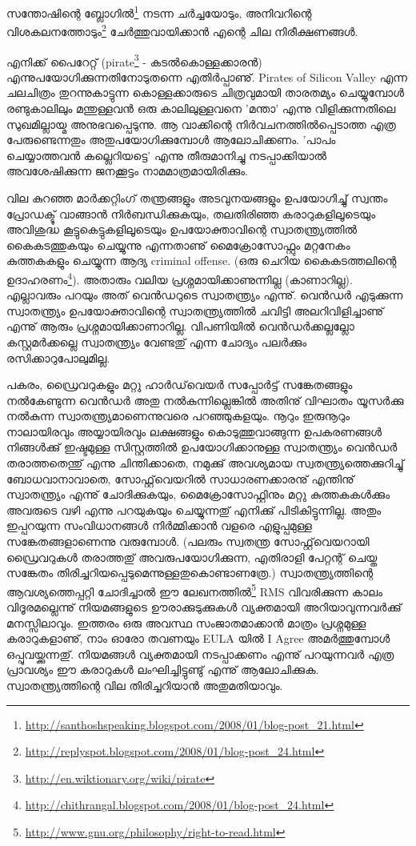﻿
\vskip 2pt

സന്തോഷിന്റെ ബ്ലോഗില്‍\footnote{\url{http://santhoshspeaking.blogspot.com/2008/01/blog-post_21.html}} നടന്ന ചര്‍ച്ചയോടും, 
അനിവറിന്റെ വിശകലനത്തോടും\footnote{\url{http://replyspot.blogspot.com/2008/01/blog-post_24.html}} ചേര്‍ത്തുവായിക്കാന്‍ 
എന്റെ ചില നിരീക്ഷണങ്ങള്‍.

എനിക്ക് പൈറേറ്റ് (pirate\footnote{\url{http://en.wiktionary.org/wiki/pirate}} - കടല്‍കൊള്ളക്കാരന്‍) 
എന്നുപയോഗിക്കുന്നതിനോടുതന്നെ എതിര്‍പ്പാണു്. Pirates of Silicon Valley എന്ന ചലചിത്രം തുറന്നുകാട്ടുന്ന 
കൊള്ളക്കാരുടെ ചിത്രവുമായി താരതമ്യം ചെയ്യുമ്പോള്‍ രണ്ടുകാലിലും മന്തുള്ളവന്‍ ഒരു കാലിലുള്ളവനെ 'മന്താ' 
എന്നു വിളിക്കുന്നതിലെ സുഖമില്ലായ്മ അനുഭവപ്പെടുന്നു. ആ വാക്കിന്റെ നിര്‍വചനത്തില്‍‌പ്പെടാത്ത എത്ര പേരുണ്ടെന്നതും 
അതുപയോഗിക്കുമ്പോള്‍ ആലോചിക്കണം. 'പാപം ചെയ്യാത്തവന്‍ കല്ലെറിയട്ടെ' എന്നു തീരുമാനിച്ചു നടപ്പാക്കിയാല്‍ 
അവശേഷിക്കുന്ന ജനക്കൂട്ടം നാമമാത്രമായിരിക്കും.

വില കുറഞ്ഞ മാര്‍ക്കറ്റിംഗ് തന്ത്രങ്ങളും അടവുനയങ്ങളും ഉപയോഗിച്ചു് സ്വന്തം പ്രോഡക്ടു് വാങ്ങാന്‍ നിര്‍ബന്ധിക്കുകയും,
തലതിരിഞ്ഞ കരാറുകളിലൂടെയും അവിശുദ്ധ കൂട്ടുകെട്ടുകളിലൂടെയും ഉപയോക്താവിന്റെ സ്വാതന്ത്ര്യത്തില്‍ കൈകടത്തുകയും 
ചെയ്യുന്നു എന്നതാണു് മൈക്രോസോഫ്റ്റും മറ്റനേകം കുത്തകകളും ചെയ്യുന്ന ആദ്യ criminal offense. 
(ഒരു ചെറിയ കൈകടത്തലിന്റെ ഉദാഹരണം\footnote{\url{http://chithrangal.blogspot.com/2008/01/blog-post_24.html}}). 
അതാരും വലിയ പ്രശ്നമായിക്കാണുന്നില്ല (കാണാറില്ല). എല്ലാവരും പറയും അത് വെന്‍ഡറുടെ സ്വാതന്ത്ര്യം എന്നു്. 
വെന്‍ഡര്‍ എടുക്കുന്ന സ്വാതന്ത്ര്യം ഉപയോക്താവിന്റെ സ്വാതന്ത്ര്യത്തില്‍ ചവിട്ടി അലറിവിളിച്ചാണു് എന്നു് ആരും 
പ്രശ്നമായിക്കാണാറില്ല. വിപണിയില്‍ വെന്‍ഡര്‍ക്കല്ലല്ലോ കസ്റ്റമര്‍ക്കല്ലെ സ്വാതന്ത്ര്യം വേണ്ടതു് എന്ന ചോദ്യം പലര്‍ക്കും 
രസിക്കാറുപോലുമില്ല.

പകരം, ഡ്രൈവറുകളും മറ്റു ഹാര്‍ഡ്‌വെയര്‍ സപ്പോര്‍ട്ട് സങ്കേതങ്ങളും നല്‍കേണ്ടുന്ന വെന്‍ഡര്‍ അതു നല്‍കുന്നില്ലെങ്കില്‍ അതിനു് 
വിഘാതം യൂസര്‍ക്കു നല്‍കുന്ന സ്വാതന്ത്ര്യമാണെന്നുവരെ പറഞ്ഞുകളയും. നൂറും ഇരുനൂറും നാലായിരവും അയ്യായിരവും 
ലക്ഷങ്ങളും കൊടുത്തുവാങ്ങുന്ന ഉപകരണങ്ങള്‍ നിങ്ങള്‍ക്കു് ഇഷ്ടമുള്ള സിസ്റ്റത്തില്‍ ഉപയോഗിക്കാനുള്ള സ്വാതന്ത്ര്യം വെന്‍ഡര്‍ 
തരാത്തതെന്തു് എന്നു ചിന്തിക്കാതെ, നമുക്കു് അവശ്യമായ സ്വതന്ത്ര്യത്തെക്കുറിച്ചു് ബോധവാനാവാതെ, സോഫ്റ്റ്‌വെയറില്‍ 
സാധാരണക്കാരനു് എന്തിനു് സ്വാതന്ത്ര്യം എന്നു് ചോദിക്കുകയും, മൈക്രോസോഫ്റ്റിനും മറ്റു കുത്തകകള്‍ക്കും അവരുടെ വഴി 
എന്നു പറയുകയും ചെയ്യുന്നതു് എനിക്കു് പിടികിട്ടുന്നില്ല. അതും ഇപ്പറയുന്ന സംവിധാനങ്ങള്‍ നിര്‍മ്മിക്കാന്‍ വളരെ 
എളുപ്പമുള്ള സങ്കേതങ്ങളാണെന്നു വരുമ്പോള്‍. (പലരും സ്വതന്ത്ര സോഫ്റ്റ്‌വെയറായി ഡ്രൈവറുകള്‍ തരാത്തതു് അവരുപയോഗിക്കുന്ന, 
എതിരാളി പേറ്റന്റ് ചെയ്ത സങ്കേതം തിരിച്ചറിയപ്പെടുമെന്നുള്ളതുകൊണ്ടാണത്രേ.) 
സ്വാതന്ത്ര്യത്തിന്റെ ആവശ്യത്തെപ്പറ്റി ചോദിച്ചാല്‍ ഈ ലേഖനത്തില്‍\footnote{\url{http://www.gnu.org/philosophy/right-to-read.html}} 
RMS വിവരിക്കുന്ന കാലം വിദൂരമല്ലെന്നു് നിയമങ്ങളുടെ ഊരാക്കുടുക്കുകള്‍ വ്യക്തമായി അറിയാവുന്നവര്‍ക്കു് മനസ്സിലാവും. 
ഇത്തരം ഒരു അവസ്ഥ സംജാതമാക്കാന്‍ മാത്രം പ്രശ്നമുള്ള കരാറുകളാണു്, നാം ഓരോ തവണയും EULA യില്‍ I Agree 
അമര്‍ത്തുമ്പോള്‍ ഒപ്പുവയ്ക്കുന്നതു്. നിയമങ്ങള്‍ വ്യക്തമായി നടപ്പാക്കണം എന്നു് പറയുന്നവര്‍ എത്ര പ്രാവശ്യം ഈ കരാറുകള്‍ 
ലംഘിച്ചിട്ടുണ്ടു് എന്നു് ആലോചിക്കുക. സ്വാതന്ത്ര്യത്തിന്റെ വില തിരിച്ചറിയാന്‍ അതുമതിയാവും.

